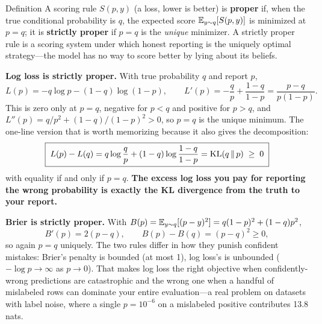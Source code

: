 \begin{mathresult}{Definition}
A scoring rule $S(p, y)$ (a loss, lower is better) is \textbf{proper} if, when the true conditional probability is $q$, the expected score
$\operatorname{\mathbb{E}}_{y \sim q}[S(p,y)]$ is minimized at $p = q$; it is \textbf{strictly proper} if $p = q$ is the \textit{unique} minimizer. A strictly proper rule is a scoring system under which honest reporting is the uniquely optimal strategy---the model has no way to score better by lying about its beliefs.
\end{mathresult}

\textbf{Log loss is strictly proper.} With true probability $q$ and report $p$,
\begin{equation}
L(p) = -q\log p - (1-q)\log(1-p), \qquad L'(p) = -\frac{q}{p} + \frac{1-q}{1-p} = \frac{p-q}{p(1-p)} .
\end{equation}
This is zero only at $p = q$, negative for $p<q$ and positive for $p>q$, and $L''(p) = q/p^2 + (1-q)/(1-p)^2 > 0$, so $p=q$ is the unique minimum. The one-line version that is worth memorizing because it also gives the decomposition:
\begin{equation}
\boxed{\;L(p) - L(q) = q\log\frac{q}{p} + (1-q)\log\frac{1-q}{1-p} = \operatorname{KL}(q \,\|\, p) \;\ge\; 0\;}
\end{equation}
with equality if and only if $p = q$. \textbf{The excess log loss you pay for reporting the wrong probability is exactly the KL divergence from the truth to your report.}

\textbf{Brier is strictly proper.} With $B(p) = \operatorname{\mathbb{E}}_{y\sim q}[(p-y)^2] = q(1-p)^2 + (1-q)p^2$,
\begin{equation}
B'(p) = 2(p - q), \qquad B(p) - B(q) = (p-q)^2 \ge 0 ,
\end{equation}
so again $p=q$ uniquely. The two rules differ in how they punish confident mistakes: Brier's penalty is bounded (at most 1), log loss's is unbounded ($-\log p \to \infty$ as $p \to 0$). That makes log loss the right objective when confidently-wrong predictions are catastrophic and the wrong one when a handful of mislabeled rows can dominate your entire evaluation---a real problem on datasets with label noise, where a single $p = 10^{-6}$ on a mislabeled positive contributes 13.8 nats.

